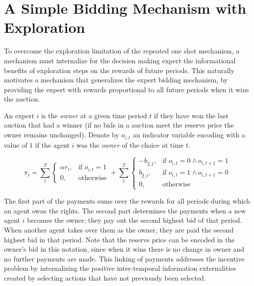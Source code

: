 \section{A Simple Bidding Mechanism with Exploration}

To overcome the exploration limitation of the repeated one shot mechanism, a mechanism must internalize for the decision making expert the informational benefits of exploration steps on the rewards of future periods.
This naturally motivates a mechanism that generalizes the expert bidding mechanism, by providing the expert with rewards proportional to all future periods when it wins the auction.

\begin{mech}
An expert $i$ is the \emph{owner} at a given time period $t$ if they have won the last auction that had a winner (if no bids in a auction meet the reserve price the owner remains unchanged). 
Denote by $o_{i,t}$ an indicator variable encoding with a value of $1$ if the agent $i$ was the \emph{owner} of the choice at time $t$. 

\[
    \pi_i =  \sum_1^T
\begin{cases}
    \alpha r_t ,& \text{if } o_{i,t} = 1\\
    0,              & \text{otherwise}
\end{cases}
+
\sum_1^T
\begin{cases}
     - b_{\hat{2},t} ,& \text{if } o_{i,t} = 0 \land o_{i,t+1} = 1\\
      b_{\hat{2},t} ,& \text{if } o_{i,t}= 1 \land o_{i,t+1} = 0 \\
		0,              & \text{otherwise}
\end{cases}
\]

\end{mech}


The first part of the payments sums over the rewards for all periods during which an agent owns the rights.
The second part determines the payments when a new agent $i$ becomes the owner; they pay out the second highest bid of that period. 
When another agent takes over them as the owner, they are paid the second highest bid in that period.
Note that the reserve price can be encoded in the owner's bid in this notation, since when it wins there is no change in owner and no further payments are made. 
This linking of payments addresses the incentive problem by internalizing the positive inter-temporal information externalities created by selecting actions that have not previously been selected.


